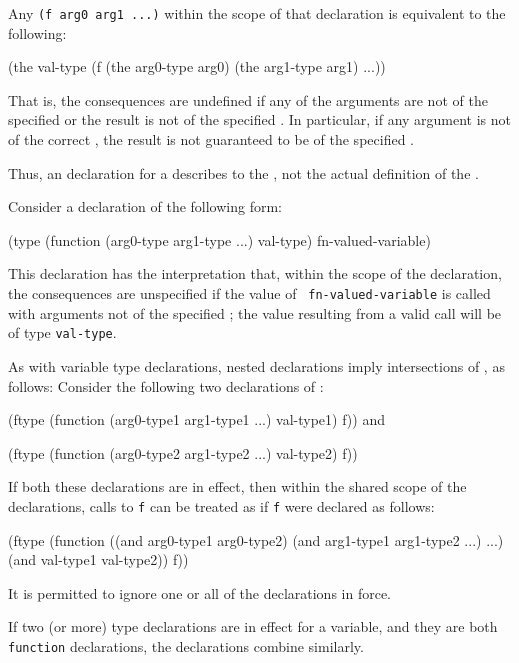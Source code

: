 Any 
{\tt (f arg0 arg1 ...)}
within the scope of
that declaration is equivalent to the following:
 
\code
 (the val-type (f (the arg0-type arg0) (the arg1-type arg1) ...))
\endcode
 
That is, the consequences are undefined if any of the arguments are
not of the specified  or the result is not of the
specified . In particular, if any argument is not of the
correct , the result is not guaranteed to be of the
specified .
 
Thus, an  declaration for a 
describes  to the , not the actual definition
of the .

Consider a declaration of the following form:

\code
 (type (function (arg0-type arg1-type ...) val-type) fn-valued-variable)
\endcode
 
This declaration has the interpretation that, within the scope of the
declaration, the consequences are unspecified if the value of {\tt
fn-valued-variable} is called with arguments not of the specified
; the value resulting from a valid call will be of type
{\tt val-type}.

As with variable type declarations, nested declarations
imply intersections of , as follows:
\beginlist
\itemitem{\bull} 
Consider the following two
declarations of :

\code
 (ftype (function (arg0-type1 arg1-type1 ...) val-type1) f))
\endcode
and

\code
 (ftype (function (arg0-type2 arg1-type2 ...) val-type2) f))
\endcode
 
If both these declarations are in effect,
then within the shared scope of the declarations, calls to {\tt f} can be
treated as if {\tt f} were declared as follows:

\code
 (ftype (function ((and arg0-type1 arg0-type2) (and arg1-type1 arg1-type2 ...) ...)
                  (and val-type1 val-type2)) 
        f))
\endcode
 
It is permitted to ignore one or all of the  declarations in force.
 
\itemitem{\bull} 
If two (or more) type declarations are in effect for a variable, and
they are both {\tt function} declarations, the declarations combine similarly.
\endlist
 
